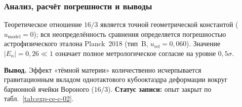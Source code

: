 \subsubsection*{Анализ, расчёт погрешности и выводы}
Теоретическое отношение $16/3$ является точной геометрической константой ($u_{\mathrm{model}} = 0$); вся неопределённость сравнения определяется погрешностью астрофизического эталона Planck~2018 (тип~B, $u_{\mathrm{ref}} = 0{,}060$).
Значение $|E_n| = 0{,}26 \ll 1$ означает полное метрологическое согласие на уровне $0{,}5\sigma$.

\textbf{Вывод.}
Эффект «тёмной материи» количественно исчерпывается гравитационным вкладом однотактового кубооктаэдра деформации вокруг барионной ячейки Вороного ($16/3$).
\textbf{Статус записи:} опыт закрыт по табл.~\ref{tab:exp-ce-c-02}.
